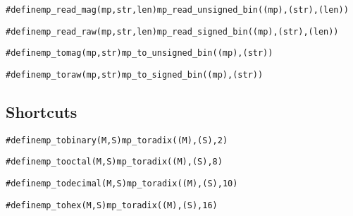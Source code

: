 \documentclass[synpaper]{book}
\begin{document}
\begin{alltt}
#define mp_read_mag(mp, str, len) mp_read_unsigned_bin((mp), (str), (len))
\end{alltt}


\begin{alltt}
 #define mp_read_raw(mp, str, len) mp_read_signed_bin((mp), (str), (len))
\end{alltt}


\begin{alltt}
#define mp_tomag(mp, str) mp_to_unsigned_bin((mp), (str))
\end{alltt}


\begin{alltt}
#define mp_toraw(mp, str)         mp_to_signed_bin((mp), (str))
\end{alltt}



\subsection{Shortcuts}

\begin{alltt}
#define mp_tobinary(M, S) mp_toradix((M), (S), 2)
\end{alltt}


\begin{alltt}
#define mp_tooctal(M, S) mp_toradix((M), (S), 8)
\end{alltt}


\begin{alltt}
#define mp_todecimal(M, S) mp_toradix((M), (S), 10)
\end{alltt}


\begin{alltt}
#define mp_tohex(M, S)     mp_toradix((M), (S), 16)
\end{alltt}



\end{document}
